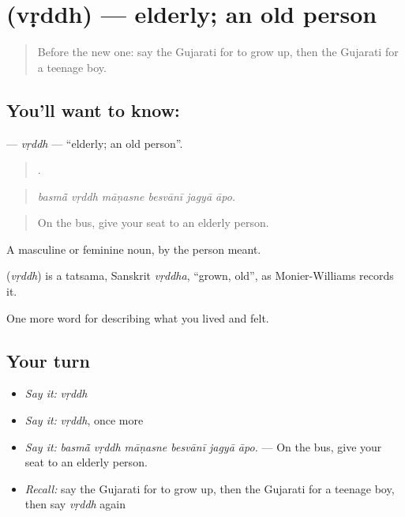 \section[\texorpdfstring{\gu{વૃદ્ધ} (vṛddh)}{વૃદ્ધ (vṛddh)}]{ (vṛddh) — elderly; an old person}

\label{lesson:GU-C494-vrddh}



\begin{quote}
Before the new one: say the Gujarati for to grow up, then the Gujarati for a teenage boy.
\end{quote}

\subsection*{You'll want to know: }
\textbf{} — \emph{vṛddh} — \textquotedblleft{}elderly; an old person\textquotedblright{}.

\begin{quote}
     .
\end{quote}

\begin{quote}
\emph{basmā̃ vṛddh māṇasne besvānī jagyā āpo.}
\end{quote}

\begin{quote}
On the bus, give your seat to an elderly person.
\end{quote}

A masculine or feminine noun, by the person meant.

\begin{cousinweb}
\textbf{} (\emph{vṛddh}) is a tatsama, Sanskrit \emph{vṛddha}, \textquotedblleft{}grown, old\textquotedblright{}, as Monier-Williams records it.
\end{cousinweb}

\begin{grammarlens}[title={What you've built}]
One more word for describing what you lived and felt.
\end{grammarlens}

\subsection*{Your turn}
\begin{itemize}
\raggedright
  \item \emph{Say it:} \emph{vṛddh}
  \item \emph{Say it:} \emph{vṛddh}, once more
  \item \emph{Say it:} \emph{basmā̃ vṛddh māṇasne besvānī jagyā āpo.} — On the bus, give your seat to an elderly person.
  \item \emph{Recall:} say the Gujarati for to grow up, then the Gujarati for a teenage boy, then say \emph{vṛddh} again
\end{itemize}

